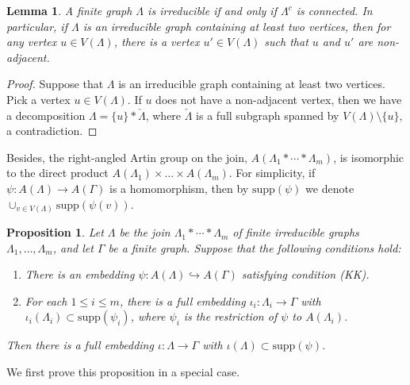 \documentclass{amsart}
\theoremstyle{definition}
\theoremstyle{plain}
\newtheorem{proposition}[definition]{Proposition}
\newtheorem{lemma}[definition]{Lemma}
\numberwithin{equation}{section}
\begin{document}
\begin{lemma}
A finite graph $\Lambda$ is irreducible if and only if $\Lambda^c$ is connected. 
In particular, if $\Lambda$ is an irreducible graph containing at least two vertices, then for any vertex $u \in V(\Lambda)$, there is a vertex $u' \in V(\Lambda)$ such that $u$ and $u'$ are non-adjacent. 
\label{irr-nonad}
\end{lemma}
\begin{proof}
Suppose that $\Lambda$ is an irreducible graph containing at least two vertices. 
Pick a vertex $u \in V(\Lambda)$. 
If $u$ does not have a non-adjacent vertex, then we have a decomposition $\Lambda= \{ u \} * \check{\Lambda}$, where $\check{\Lambda}$ is a full subgraph spanned by $V(\Lambda) \setminus \{ u \}$, a contradiction. 
\end{proof}

Besides, the right-angled Artin group on the join,  $A(\Lambda_1 * \cdots *\Lambda_m)$, is isomorphic to the direct product $A(\Lambda_1) \times \dots \times A(\Lambda_m)$.  
For simplicity, if $\psi \colon A(\Lambda) \rightarrow A(\Gamma)$ is a homomorphism, then by $\mathrm{supp}(\psi)$ we denote $\cup_{v \in V(\Lambda)}\mathrm{supp}(\psi(v))$. 

\begin{proposition}
Let $\Lambda$ be the join $\Lambda_1 * \cdots * \Lambda_m$ of finite irreducible graphs $\Lambda_1, \ldots, \Lambda_m$, and let $\Gamma$ be a finite graph. 
Suppose that the following conditions hold: 
\begin{enumerate}
 \item[(1)] There is an embedding $\psi \colon A(\Lambda) \hookrightarrow A(\Gamma)$ satisfying condition (KK). 
 \item[(2)] For each $1 \leq i \leq m$, there is a full embedding $\iota_i \colon \Lambda_i \rightarrow \Gamma$ with $\iota_i(\Lambda_i) \subset \mathrm{supp}(\psi_i)$, where $\psi_i$ is the restriction of $\psi$ to $A(\Lambda_i)$. 
 \label{joining-EGP}
\end{enumerate} 
Then there is a full embedding $\iota \colon \Lambda \rightarrow \Gamma$ with $\iota(\Lambda) \subset  \mathrm{supp}(\psi)$. 
\end{proposition}

We first prove this proposition in a special case. 
\end{document}
